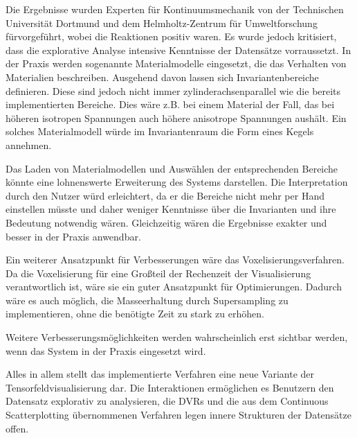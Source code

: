 \documentclass[a4paper,fontsize=12pt,toc=bib,halfparskip]{scrartcl}
\begin{document}
Die Ergebnisse wurden Experten f\"ur Kontinuumsmechanik von der Technischen Universit\"at Dortmund und dem Helmholtz-Zentrum f\"ur Umweltforschung f\"urvorgef\"uhrt, wobei die Reaktionen positiv waren. Es wurde jedoch kritisiert, dass die explorative Analyse intensive Kenntnisse der Datens\"atze vorraussetzt. In der Praxis werden sogenannte Materialmodelle eingesetzt, die das Verhalten von Materialien beschreiben. Ausgehend davon lassen sich Invariantenbereiche definieren. Diese sind jedoch nicht immer zylinderachsenparallel wie die bereits implementierten Bereiche. Dies w\"are z.B. bei einem Material der Fall, das bei h\"oheren isotropen Spannungen auch h\"ohere anisotrope Spannungen aush\"alt. Ein solches Materialmodell w\"urde im Invariantenraum die Form eines Kegels annehmen. 

Das Laden von Materialmodellen und Ausw\"ahlen der entsprechenden Bereiche k\"onnte eine lohnenswerte Erweiterung des Systems darstellen. Die Interpretation durch den Nutzer w\"urd erleichtert, da er die Bereiche nicht mehr per Hand einstellen m\"usste und daher weniger Kenntnisse \"uber die Invarianten und ihre Bedeutung notwendig w\"aren. Gleichzeitig w\"aren die Ergebnisse exakter und besser in der Praxis anwendbar. 

Ein weiterer Ansatzpunkt f\"ur Verbesserungen w\"are das Voxelisierungsverfahren. Da die Voxelisierung f\"ur eine Gro{\ss}teil der Rechenzeit der Visualisierung verantwortlich ist, w\"are sie ein guter Ansatzpunkt f\"ur Optimierungen. Dadurch w\"are es auch m\"oglich, die Masseerhaltung durch Supersampling zu implementieren, ohne die ben\"otigte Zeit zu stark zu erh\"ohen.
 
Weitere Verbesserungsm\"oglichkeiten werden wahrscheinlich erst sichtbar werden, wenn das System in der Praxis eingesetzt wird. 

Alles in allem stellt das implementierte Verfahren eine neue Variante der Tensorfeldvisualisierung dar. Die Interaktionen erm\"oglichen es Benutzern den Datensatz explorativ zu analysieren, die DVRs und die aus dem Continuous Scatterplotting \"ubernommenen Verfahren legen innere Strukturen der Datens\"atze offen.


\label{LastPageBeforeRefs}
\clearpage
{}

\printbibliography[type=thesis,title={Abschlussarbeiten}]
\printbibliography[type=book,title={Bücher}]
\printbibliography[filter=papers,title={Artikel}]
\printbibliography[type=online,title={Internetressourcen}]
\label{LastBibPage}
\end{document}
